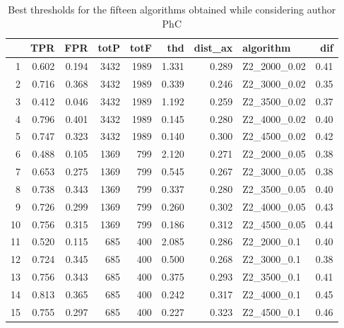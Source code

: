 \documentclass{article}\usepackage[]{graphicx}\usepackage[]{color}
\begin{document}
\begin{table}[ht]
\centering
\begin{tabular}{rrrrrrrlr}
  \hline
 & TPR & FPR & totP & totF & thd & dist\_ax & algorithm & dif \\ 
  \hline
1 & 0.602 & 0.194 & 3432 & 1989 & 1.331 & 0.289 & Z2\_2000\_0.02 & 0.41 \\ 
  2 & 0.716 & 0.368 & 3432 & 1989 & 0.339 & 0.246 & Z2\_3000\_0.02 & 0.35 \\ 
  3 & 0.412 & 0.046 & 3432 & 1989 & 1.192 & 0.259 & Z2\_3500\_0.02 & 0.37 \\ 
  4 & 0.796 & 0.401 & 3432 & 1989 & 0.145 & 0.280 & Z2\_4000\_0.02 & 0.40 \\ 
  5 & 0.747 & 0.323 & 3432 & 1989 & 0.140 & 0.300 & Z2\_4500\_0.02 & 0.42 \\ 
  6 & 0.488 & 0.105 & 1369 & 799 & 2.120 & 0.271 & Z2\_2000\_0.05 & 0.38 \\ 
  7 & 0.653 & 0.275 & 1369 & 799 & 0.545 & 0.267 & Z2\_3000\_0.05 & 0.38 \\ 
  8 & 0.738 & 0.343 & 1369 & 799 & 0.337 & 0.280 & Z2\_3500\_0.05 & 0.40 \\ 
  9 & 0.726 & 0.299 & 1369 & 799 & 0.260 & 0.302 & Z2\_4000\_0.05 & 0.43 \\ 
  10 & 0.756 & 0.315 & 1369 & 799 & 0.186 & 0.312 & Z2\_4500\_0.05 & 0.44 \\ 
  11 & 0.520 & 0.115 & 685 & 400 & 2.085 & 0.286 & Z2\_2000\_0.1 & 0.40 \\ 
  12 & 0.724 & 0.345 & 685 & 400 & 0.500 & 0.268 & Z2\_3000\_0.1 & 0.38 \\ 
  13 & 0.756 & 0.343 & 685 & 400 & 0.375 & 0.293 & Z2\_3500\_0.1 & 0.41 \\ 
  14 & 0.813 & 0.365 & 685 & 400 & 0.242 & 0.317 & Z2\_4000\_0.1 & 0.45 \\ 
  15 & 0.755 & 0.297 & 685 & 400 & 0.227 & 0.323 & Z2\_4500\_0.1 & 0.46 \\ 
   \hline
\end{tabular}
\caption{Best thresholds for the fifteen algorithms obtained while considering author PhC} 
\label{tab:bestPhC}
\end{table}
\end{document}
